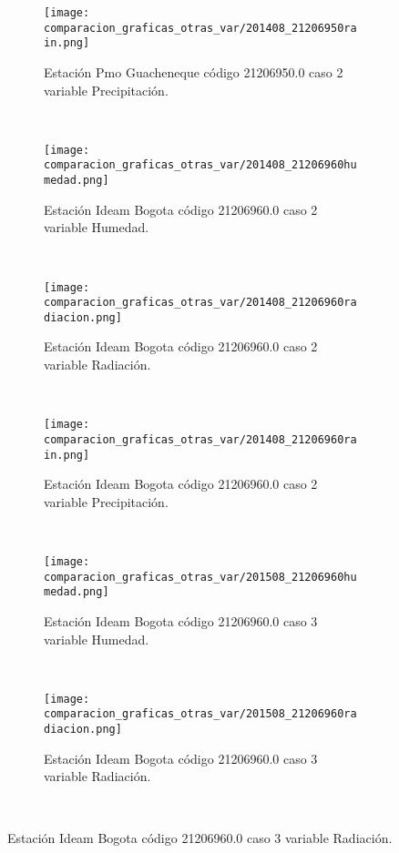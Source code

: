 \begin{figure}[H]
\centering
\begin{subfigure}[normla]{0.4\textwidth}
\caption{Estación Pmo Guacheneque código 21206950.0 caso 2 variable Precipitación.}
\texttt{[image: comparacion\_graficas\_otras\_var/201408\_21206950rain.png]}
\end{subfigure}
~
\begin{subfigure}[normla]{0.4\textwidth}
\caption{Estación Ideam Bogota código 21206960.0 caso 2 variable Humedad.}
\texttt{[image: comparacion\_graficas\_otras\_var/201408\_21206960humedad.png]}
\end{subfigure}
~
\begin{subfigure}[normla]{0.4\textwidth}
\caption{Estación Ideam Bogota código 21206960.0 caso 2 variable Radiación.}
\texttt{[image: comparacion\_graficas\_otras\_var/201408\_21206960radiacion.png]}
\end{subfigure}
~
\begin{subfigure}[normla]{0.4\textwidth}
\caption{Estación Ideam Bogota código 21206960.0 caso 2 variable Precipitación.}
\texttt{[image: comparacion\_graficas\_otras\_var/201408\_21206960rain.png]}
\end{subfigure}
~
\begin{subfigure}[normla]{0.4\textwidth}
\caption{Estación Ideam Bogota código 21206960.0 caso 3 variable Humedad.}
\texttt{[image: comparacion\_graficas\_otras\_var/201508\_21206960humedad.png]}
\end{subfigure}
~
\begin{subfigure}[normla]{0.4\textwidth}
\caption{Estación Ideam Bogota código 21206960.0 caso 3 variable Radiación.}
\texttt{[image: comparacion\_graficas\_otras\_var/201508\_21206960radiacion.png]}
\end{subfigure}
~
\end{figure}
           
